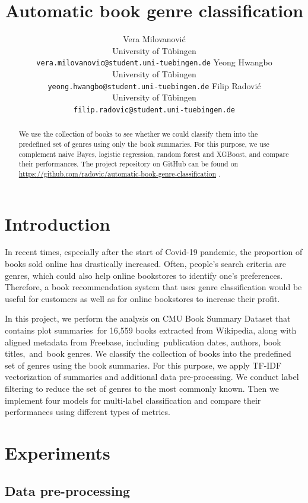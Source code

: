 \documentclass{article}
\title{Automatic book genre classification}
\author{%
  Vera Milovanović\\
  University of Tübingen\\
  \texttt{vera.milovanovic@student.uni-tuebingen.de}
  \And
  Yeong Hwangbo\\
  University of Tübingen\\
  \texttt{yeong.hwangbo@student.uni-tuebingen.de}
  \And
  Filip Radović\\
  University of Tübingen\\
  \texttt{filip.radovic@student.uni-tuebingen.de}\\
}
\begin{document}
\maketitle


\begin{abstract}
  We use the collection of books to see whether we could classify them into the predefined set of genres using only the book summaries.  For this purpose, we use complement naive Bayes, logistic regression, random forest and XGBoost, and compare their performances. The project repository on GitHub can be found on \url{https://github.com/radovic/automatic-book-genre-classification} .
\end{abstract}


\section{Introduction}

\par In recent times, especially after the start of Covid-19 pandemic, the proportion of books sold online has drastically increased. Often, people's search criteria are genres, which could also help online bookstores to identify one’s preferences. Therefore, a book recommendation system that uses genre classification would be useful for customers as well as for online bookstores to increase their profit.
\par In this project, we perform the analysis on CMU Book Summary Dataset \cite{dataset} that contains plot summaries for 16,559 books extracted from Wikipedia, along with aligned metadata from Freebase, including publication dates, authors, book titles, and book genres. We classify the collection of books into the predefined set of genres using the book summaries. For this purpose, we apply TF-IDF vectorization of summaries and additional data pre-processing. We conduct label filtering to reduce the set of genres to the most commonly known. Then we implement four models for multi-label classification and compare their performances using different types of metrics. 


\section{Experiments}

\subsection{Data pre-processing}
\end{document}
